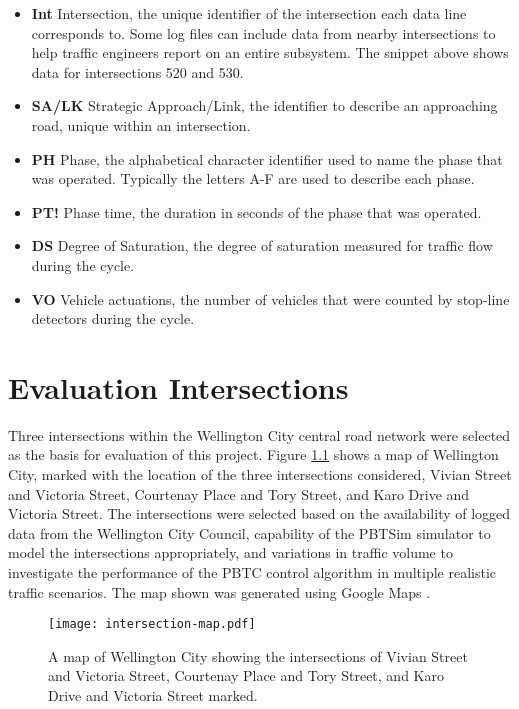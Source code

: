 \begin{appendices}
\begin{itemize}
\item \textbf{Int} Intersection, the unique identifier of the intersection each data line corresponds to. Some log files can include data from nearby intersections to help traffic engineers report on an entire subsystem. The snippet above shows data for intersections 520 and 530.
\item \textbf{SA/LK} Strategic Approach/Link, the identifier to describe an approaching road, unique within an intersection.
\item \textbf{PH} Phase, the alphabetical character identifier used to name the phase that was operated. Typically the letters A-F are used to describe each phase. 
\item \textbf{PT!} Phase time, the duration in seconds of the phase that was operated.
\item \textbf{DS} Degree of Saturation, the degree of saturation measured for traffic flow during the cycle.
\item \textbf{VO} Vehicle actuations, the number of vehicles that were counted by stop-line detectors during the cycle.
\end{itemize}

\chapter{Evaluation Intersections}
\label{appendix:scats_intersections}

Three intersections within the Wellington City central road network were selected as the basis for evaluation of this project. Figure \ref{intersectionmap} shows a map of Wellington City, marked with the location of the three intersections considered, Vivian Street and Victoria Street, Courtenay Place and Tory Street, and Karo Drive and Victoria Street. The intersections were selected based on the availability of logged data from the Wellington City Council, capability of the PBTSim simulator to model the intersections appropriately, and variations in traffic volume to investigate the performance of the PBTC control algorithm in multiple realistic traffic scenarios. The map shown was generated using Google Maps \cite{google-maps}.

\begin{figure}[]
\centering
	\texttt{[image: intersection-map.pdf]}
	\caption[A map of Wellington City showing intersections used for evaluation]{ A map of Wellington City showing the intersections of Vivian Street and Victoria Street, Courtenay Place and Tory Street, and Karo Drive and Victoria Street marked. }
\label{intersectionmap}
\end{figure}



\end{appendices}
